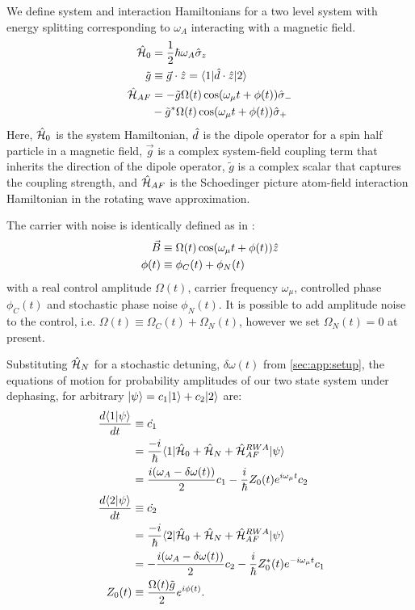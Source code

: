 We define system and interaction Hamiltonians for a two level system with energy splitting corresponding to $\omega_A$  interacting with a magnetic field. 
\\
\begin{align}
\hat{\mathcal{H}}_0 &= \frac{1}{2} \hbar \omega_A \hat{\sigma}_{z} \\
\tilde{g} & \equiv \vec{g} \cdot \hat{z} = \langle 1 | \hat{d} \cdot \hat{z} | 2 \rangle \\
\hat{\mathcal{H}}_{AF} & = -\tilde{g} \Omega(t)  \cos(\omega_\mu t + \phi(t)) \hat{\sigma}_{-} \\
& - \tilde{g}^* \Omega(t)  \cos(\omega_\mu t + \phi(t)) \hat{\sigma}_{+}
\end{align} Here, $\hat{\mathcal{H}}_0$ is the system Hamiltonian, $\hat{d}$ is the dipole operator for a spin half particle in a magnetic field, $\vec{g}$ is a complex system-field coupling term that inherits the direction of the dipole operator, $\tilde{g}$ is a complex scalar that captures the coupling strength, and $\hat{\mathcal{H}}_{AF}$ is the Schoedinger picture atom-field interaction Hamiltonian in the rotating wave approximation.

The carrier with noise is identically defined as in \cite{soare2014}:
\begin{align}
\vec{B} &\equiv \Omega(t) \cos(\omega_\mu t + \phi(t)) \hat{z} \\
\phi(t) & \equiv \phi_C(t) + \phi_N(t)
\end{align}
with a real control amplitude $\Omega(t)$, carrier frequency $\omega_\mu$, controlled phase $\phi_C(t)$ and stochastic phase noise $\phi_N(t)$.  It is possible to add amplitude noise to the control, i.e. $\Omega(t) \equiv \Omega_C(t) + \Omega_N(t)$, however we set $\Omega_N(t) =0$ at present. 

Substituting $\hat{\mathcal{H}}_{N}$ for a stochastic detuning, $\delta \omega (t)$ from \cref{sec:app:setup}, the equations of motion for probability amplitudes of our two state system under dephasing, for arbitrary $| \psi \rangle = c_1 | 1 \rangle + c_2| 2 \rangle $ are:
\begin{align}
\frac{d \langle 1 |\psi\rangle}{dt} &\equiv \dot{c_1} \\
& = \frac{-i}{\hbar}\langle 1 | \hat{\mathcal{H}}_0 + \hat{\mathcal{H}}_{N} + \hat{\mathcal{H}}_{AF}^{RWA}  | \psi \rangle \\
& = \frac{i(\omega_A - \delta\omega(t)) }{2}c_1 - \frac{i}{\hbar}Z_0(t) e^{i\omega_\mu t}c_2\\
\frac{d \langle 2 |\psi\rangle}{dt} &\equiv \dot{c_2} \\
& = \frac{-i}{\hbar}\langle 2 | \hat{\mathcal{H}}_0 + \hat{\mathcal{H}}_{N} + \hat{\mathcal{H}}_{AF}^{RWA}  | \psi \rangle \\
& = -\frac{i(\omega_A - \delta\omega(t)) }{2}c_2 - \frac{i}{\hbar}Z_0^*(t) e^{-i\omega_\mu t}c_1 \\
\quad Z_0(t) &\equiv \frac{\Omega(t)\tilde{g}}{2}e^{i\phi(t)}.
\end{align}

